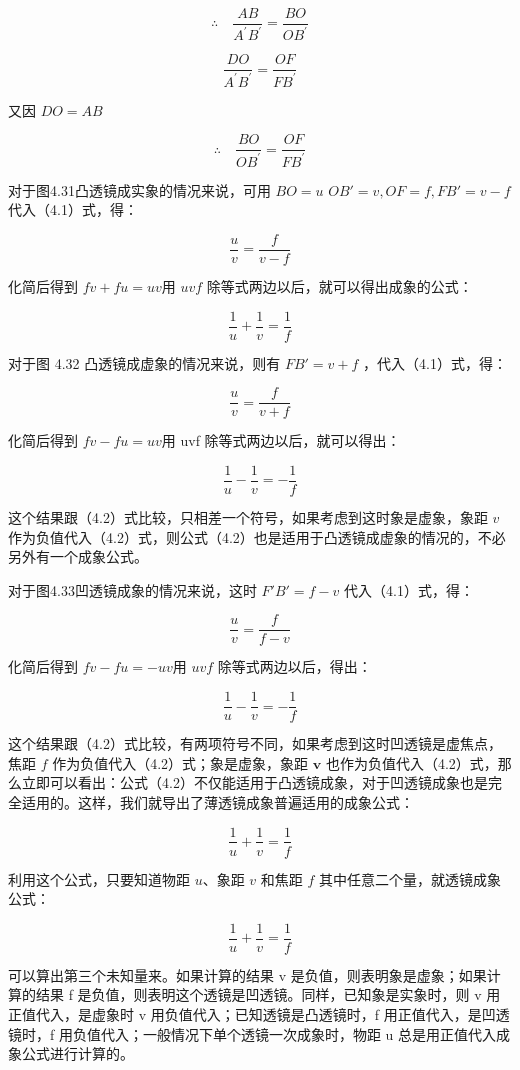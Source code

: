 \[
\therefore \quad \frac {A B}{A ^ {\prime} B ^ {\prime}} = \frac {B O}{O B ^ {\prime}}
\]

\[
\frac {D O}{A ^ {\prime} B ^ {\prime}} = \frac {O F}{F B ^ {\prime}}
\]

又因 \(DO = AB\)

\[
\therefore \quad \frac {B O}{O B ^ {\prime}} = \frac {O F}{F B ^ {\prime}} \tag {4.1}
\]

对于图4.31凸透镜成实象的情况来说，可用 \(BO = u\)
\(OB' = v, OF = f, FB' = v - f\) 代入（4.1）式，得：

\[
\frac {u}{v} = \frac {f}{v - f}
\]

化简后得到 \(fv + fu = uv\)用 \(uvf\)
除等式两边以后，就可以得出成象的公式：

\[
\frac {1}{u} + \frac {1}{v} = \frac {1}{f} \tag {4.2}
\]

对于图 4.32 凸透镜成虚象的情况来说，则有 \(FB' = v + f\)
，代入（4.1）式，得：

\[
\frac {u}{v} = \frac {f}{v + f}
\]

化简后得到 \(fv - fu = uv\)用 uvf 除等式两边以后，就可以得出：

\[
\frac {1}{u} - \frac {1}{v} = - \frac {1}{f}
\]

这个结果跟（4.2）式比较，只相差一个符号，如果考虑到这时象是虚象，象距
\(v\)
作为负值代入（4.2）式，则公式（4.2）也是适用于凸透镜成虚象的情况的，不必另外有一个成象公式。

对于图4.33凹透镜成象的情况来说，这时 \(F'B' = f - v\)
代入（4.1）式，得：

\[
\frac {u}{v} = \frac {f}{f - v}
\]

化简后得到 \(fv - fu = -uv\)用 \(uvf\) 除等式两边以后，得出：

\[
\frac {1}{u} - \frac {1}{v} = - \frac {1}{f}
\]

这个结果跟（4.2）式比较，有两项符号不同，如果考虑到这时凹透镜是虚焦点，焦距
\(f\) 作为负值代入（4.2）式；象是虚象，象距 \(\pmb{v}\)
也作为负值代入（4.2）式，那么立即可以看出：公式（4.2）不仅能适用于凸透镜成象，对于凹透镜成象也是完全适用的。这样，我们就导出了薄透镜成象普遍适用的成象公式：

\[
\frac {1}{u} + \frac {1}{v} = \frac {1}{f}
\]

利用这个公式，只要知道物距 \(u\)、象距 \(v\) 和焦距 \(f\)
其中任意二个量，就透镜成象公式：

\[
\frac {1}{u} + \frac {1}{v} = \frac {1}{f}
\]

可以算出第三个未知量来。如果计算的结果 v
是负值，则表明象是虚象；如果计算的结果 f
是负值，则表明这个透镜是凹透镜。同样，已知象是实象时，则 v
用正值代入，是虚象时 v 用负值代入；已知透镜是凸透镜时，f
用正值代入，是凹透镜时，f 用负值代入；一般情况下单个透镜一次成象时，物距
u 总是用正值代入成象公式进行计算的。

